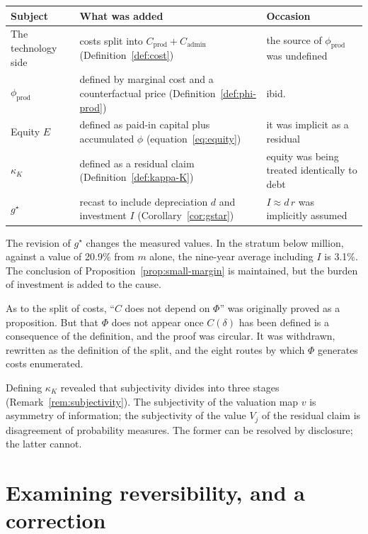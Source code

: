 \begin{center}
\begin{tabularx}{\textwidth}{@{}lXl@{}}
\toprule
Subject & What was added & Occasion \\
\midrule
The technology side & costs split into $C_{\mathrm{prod}}+C_{\mathrm{admin}}$ (Definition~\ref{def:cost}) & the source of $\phi_{\mathrm{prod}}$ was undefined \\
$\phi_{\mathrm{prod}}$ & defined by marginal cost and a counterfactual price (Definition~\ref{def:phi-prod}) & ibid. \\
Equity $E$ & defined as paid-in capital plus accumulated $\phi$ (equation~\eqref{eq:equity}) & it was implicit as a residual \\
$\kappa_K$ & defined as a residual claim (Definition~\ref{def:kappa-K}) & equity was being treated identically to debt \\
$g^\star$ & recast to include depreciation $d$ and investment $I$ (Corollary~\ref{cor:gstar}) & $I\approx d\,r$ was implicitly assumed \\
\bottomrule
\end{tabularx}
\label{tab:definition-supplements}
\end{center}

The revision of $g^\star$ changes the measured values. In the stratum below  million,
against a value of 20.9\% from $m$ alone, the nine-year average including $I$ is 3.1\%. The
conclusion of Proposition~\ref{prop:small-margin} is maintained, but the burden of investment is
added to the cause.

As to the split of costs, ``$C$ does not depend on $\Phi$'' was originally proved as a
proposition. But that $\Phi$ does not appear once $C(\delta)$ has been defined is a consequence of
the definition, and the proof was circular. It was withdrawn, rewritten as the definition of the
split, and the eight routes by which $\Phi$ generates costs enumerated.

Defining $\kappa_K$ revealed that subjectivity divides into three stages
(Remark~\ref{rem:subjectivity}). The subjectivity of the valuation map $v$ is asymmetry of
information; the subjectivity of the value $V_j$ of the residual claim is disagreement of
probability measures. The former can be resolved by disclosure; the latter cannot.

\section{Examining reversibility, and a correction}

